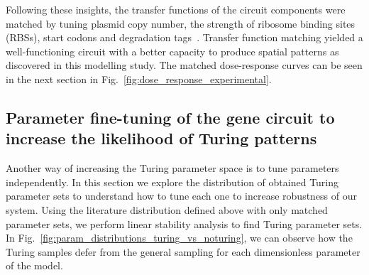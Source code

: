 Following these insights, the transfer functions of the circuit components were matched by tuning plasmid copy number,
the strength of ribosome binding sites (RBSs),
start codons and degradation tags~\parencite{Andersen1998, Wang2011,Hecht2017}.
Transfer function matching yielded a well-functioning circuit with a better capacity to produce spatial patterns
as discovered in this modelling study.
The matched dose-response curves can be seen in the next section in Fig.~\ref{fig:dose_response_experimental}.


\subsection{Parameter fine-tuning of the gene circuit to increase the likelihood of Turing patterns}
Another way of increasing the Turing parameter space is to tune parameters independently.
In this section we explore the distribution of obtained Turing parameter sets
to understand how to tune each one to increase robustness of our system.
Using the literature distribution defined above with only matched
parameter sets, we perform linear stability analysis to find Turing parameter sets.
In Fig.~\ref{fig:param_distributions_turing_vs_noturing},
we can observe how the Turing samples defer from the general sampling for each dimensionless parameter of the model.

